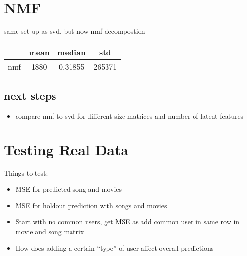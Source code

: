 \documentclass[]{article}
\begin{document}
\section{NMF}
same set up as svd, but now nmf decompostion

\begin{tabular}{l |c | c| c|}
    & mean & median & std\\
    \hline
    nmf & 1880 & 0.31855 & 265371\\
\end{tabular}

\subsection{next steps}
\begin{itemize}
    \item compare nmf to svd for different size matrices and number of latent features
\end{itemize}

\section{Testing Real Data}
Things to test:
\begin{itemize}
    \item MSE for predicted song and movies
    \item MSE for holdout prediction with songs and movies
    \item Start with no common users, get MSE as add common user in same row in movie and song matrix
    \item How does adding a certain ``type'' of user affect overall predictions
\end{itemize}
\end{document}
